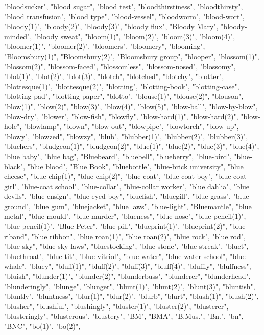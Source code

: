 "bloodsucker",
"blood sugar",
"blood test",
"bloodthirstiness",
"bloodthirsty",
"blood transfusion",
"blood type",
"blood-vessel",
"bloodworm",
"blood-wort",
"bloody(1)",
"bloody(2)",
"bloody(3)",
"bloody flux",
"Bloody Mary",
"bloody-minded",
"bloody sweat",
"bloom(1)",
"bloom(2)",
"bloom(3)",
"bloom(4)",
"bloomer(1)",
"bloomer(2)",
"bloomers",
"bloomery",
"blooming",
"Bloomsbury(1)",
"Bloomsbury(2)",
"Bloomsbury group",
"blooper",
"blossom(1)",
"blossom(2)",
"blossom-faced",
"blossomless",
"blossom-nosed",
"blossomy",
"blot(1)",
"blot(2)",
"blot(3)",
"blotch",
"blotched",
"blotchy",
"blotter",
"blottesque(1)",
"blottesque(2)",
"blotting",
"blotting-book",
"blotting-case",
"blotting-pad",
"blotting-paper",
"blotto",
"blouse(1)",
"blouse(2)",
"blouson",
"blow(1)",
"blow(2)",
"blow(3)",
"blow(4)",
"blow(5)",
"blow-ball",
"blow-by-blow",
"blow-dry",
"blower",
"blow-fish",
"blowfly",
"blow-hard(1)",
"blow-hard(2)",
"blow-hole",
"blowlamp",
"blown",
"blow-out",
"blowpipe",
"blowtorch",
"blow-up",
"blowy",
"blowzed",
"blowzy",
"blub",
"blubber(1)",
"blubber(2)",
"blubber(3)",
"bluchers",
"bludgeon(1)",
"bludgeon(2)",
"blue(1)",
"blue(2)",
"blue(3)",
"blue(4)",
"blue baby",
"blue bag",
"Bluebeard",
"bluebell",
"blueberry",
"blue-bird",
"blue-black",
"blue blood",
"Blue Book",
"bluebottle",
"blue-brick university",
"blue cheese",
"blue chip(1)",
"blue chip(2)",
"blue coat",
"blue-coat boy",
"blue-coat girl",
"blue-coat school",
"blue-collar",
"blue-collar worker",
"blue dahlia",
"blue devils",
"blue ensign",
"blue-eyed boy",
"bluefish",
"bluegill",
"blue grass",
"blue ground",
"blue gum",
"bluejacket",
"blue laws",
"blue-light",
"Bluemantle",
"blue metal",
"blue mould",
"blue murder",
"blueness",
"blue-nose",
"blue pencil(1)",
"blue-pencil(1)",
"Blue Peter",
"blue pill",
"blueprint(1)",
"blueprint(2)",
"blue riband",
"blue ribbon",
"blue roan(1)",
"blue roan(2)",
"blue rock",
"blue rod",
"blue-sky",
"blue-sky laws",
"bluestocking",
"blue-stone",
"blue streak",
"bluet",
"bluethroat",
"blue tit",
"blue vitriol",
"blue water",
"blue-water school",
"blue whale",
"bluey",
"bluff(1)",
"bluff(2)",
"bluff(3)",
"bluff(4)",
"bluffly",
"bluffness",
"bluish",
"blunder(1)",
"blunder(2)",
"blunderbuss",
"blunderer",
"blunderhead",
"blunderingly",
"blunge",
"blunger",
"blunt(1)",
"blunt(2)",
"blunt(3)",
"bluntish",
"bluntly",
"bluntness",
"blur(1)",
"blur(2)",
"blurb",
"blurt",
"blush(1)",
"blush(2)",
"blusher",
"blushful",
"blushingly",
"bluster(1)",
"bluster(2)",
"blusterer",
"blusteringly",
"blusterous",
"blustery",
"BM",
"BMA",
"B.Mus.",
"Bn.",
"bn",
"BNC",
"bo(1)",
"bo(2)",
